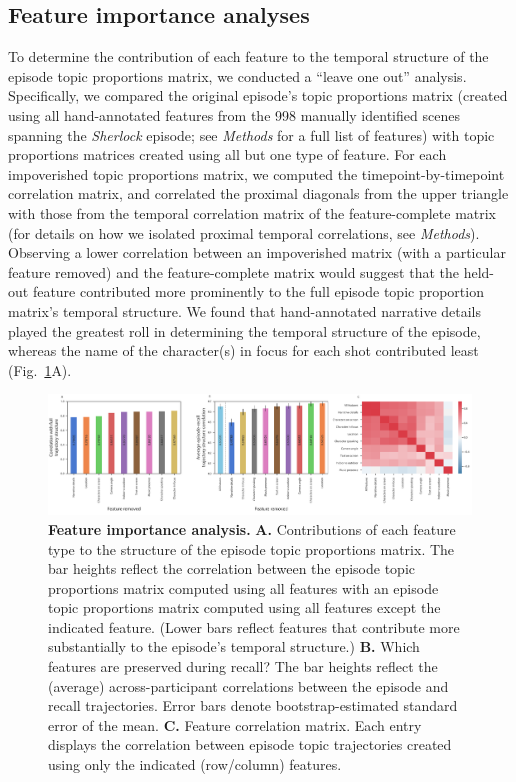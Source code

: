 \documentclass{article}
\begin{document}
\subsection*{Feature importance analyses}
To determine the contribution of each feature to the temporal structure of the episode topic proportions matrix, we conducted a ``leave one out'' analysis.  Specifically, we compared the original episode's topic proportions matrix (created using all hand-annotated features from the 998 manually identified scenes spanning the \textit{Sherlock} episode; see \textit{Methods} for a full list of features) with topic proportions matrices created using all but one type of feature.  For each impoverished topic proportions matrix, we computed the timepoint-by-timepoint correlation matrix, and correlated the proximal diagonals from the upper triangle with those from the temporal correlation matrix of the feature-complete matrix (for details on how we isolated proximal temporal correlations, see \textit{Methods}).  Observing a lower correlation between an impoverished matrix (with a particular feature removed) and the feature-complete matrix would suggest that the held-out feature contributed more prominently to the full episode topic proportion matrix's temporal structure.  We found that hand-annotated narrative details played the greatest roll in determining the temporal structure of the episode, whereas the name of the character(s) in focus for each shot contributed least (Fig.~\ref{fig:feature-importance}A).

\begin{figure}[]
\centering
\includegraphics[width=1\textwidth]{figs/feature_value}
\caption{\small \textbf{Feature importance analysis.} \textbf{A.} Contributions of each feature type to the structure of the episode topic proportions matrix. The bar heights reflect the correlation between the episode topic proportions matrix computed using all features with an episode topic proportions matrix computed using all features except the indicated feature.  (Lower bars reflect features that contribute more substantially to the episode's temporal structure.) \textbf{B.} Which features are preserved during recall?  The bar heights reflect the (average) across-participant correlations between the episode and recall trajectories.  Error bars denote bootstrap-estimated standard error of the mean.  \textbf{C.} Feature correlation matrix.  Each entry displays the correlation between episode topic trajectories created using only the indicated (row/column) features.}
\label{fig:feature-importance}
\end{figure}
\end{document}
